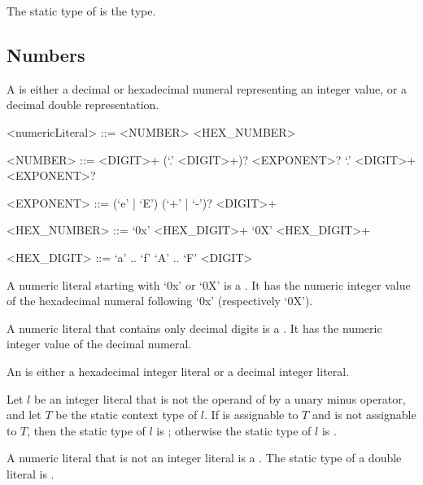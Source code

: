 \documentclass[makeidx]{article}
\begin{document}
{

\LMHash{}%
The static type of \NULL{} is the  type.


\subsection{Numbers}

\LMHash{}%
A 
is either a decimal or hexadecimal numeral representing an integer value,
or a decimal double representation.

\begin{grammar}
<numericLiteral> ::= <NUMBER>
  \alt <HEX\_NUMBER>

<NUMBER> ::= <DIGIT>+ (`.' <DIGIT>+)? <EXPONENT>?
  \alt `.' <DIGIT>+ <EXPONENT>?

<EXPONENT> ::= (`e' | `E') (`+' | `-')? <DIGIT>+

<HEX\_NUMBER> ::= `0x' <HEX\_DIGIT>+
  \alt `0X' <HEX\_DIGIT>+

<HEX\_DIGIT> ::= `a' .. `f'
  \alt `A' .. `F'
  \alt <DIGIT>
\end{grammar}

\LMHash{}%
A numeric literal starting with `0x' or `0X'
is a .
It has the numeric integer value of the hexadecimal numeral
following `0x' (respectively `0X').

\LMHash{}%
A numeric literal that contains only decimal digits is a
.
It has the numeric integer value of the decimal numeral.

\LMHash{}%
An 
is either a hexadecimal integer literal or a decimal integer literal.

\LMHash{}%
Let $l$ be an integer literal that is not the operand
of by a unary minus operator,
and let $T$ be the static context type of $l$.
If  is assignable to $T$ and  is not assignable to $T$,
then the static type of $l$ is ;
otherwise the static type of $l$ is .


\LMHash{}%
A numeric literal that is not an integer literal is a
.
The static type of a double literal is .

}
\end{document}
